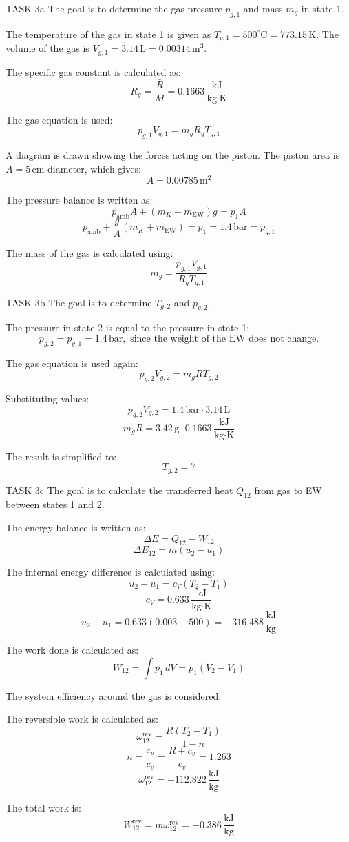 TASK 3a  
The goal is to determine the gas pressure \( p_{g,1} \) and mass \( m_g \) in state 1.  

The temperature of the gas in state 1 is given as \( T_{g,1} = 500^\circ\text{C} = 773.15 \, \text{K} \).  
The volume of the gas is \( V_{g,1} = 3.14 \, \text{L} = 0.00314 \, \text{m}^3 \).  

The specific gas constant is calculated as:  
\[
R_g = \frac{\bar{R}}{M} = 0.1663 \, \frac{\text{kJ}}{\text{kg·K}}
\]  

The gas equation is used:  
\[
p_{g,1} V_{g,1} = m_g R_g T_{g,1}
\]  

A diagram is drawn showing the forces acting on the piston. The piston area is \( A = 5 \, \text{cm diameter} \), which gives:  
\[
A = 0.00785 \, \text{m}^2
\]  

The pressure balance is written as:  
\[
p_{\text{amb}} A + (m_K + m_{\text{EW}}) g = p_{1} A
\]  
\[
p_{\text{amb}} + \frac{g}{A} (m_K + m_{\text{EW}}) = p_{1} = 1.4 \, \text{bar} = p_{g,1}
\]  

The mass of the gas is calculated using:  
\[
m_g = \frac{p_{g,1} V_{g,1}}{R_g T_{g,1}}
\]  

TASK 3b  
The goal is to determine \( T_{g,2} \) and \( p_{g,2} \).  

The pressure in state 2 is equal to the pressure in state 1:  
\[
p_{g,2} = p_{g,1} = 1.4 \, \text{bar}, \text{ since the weight of the EW does not change.}
\]  

The gas equation is used again:  
\[
p_{g,2} V_{g,2} = m_g R T_{g,2}
\]  

Substituting values:  
\[
p_{g,2} V_{g,2} = 1.4 \, \text{bar} \cdot 3.14 \, \text{L}
\]  
\[
m_g R = 3.42 \, \text{g} \cdot 0.1663 \, \frac{\text{kJ}}{\text{kg·K}}
\]  

The result is simplified to:  
\[
T_{g,2} = 7
\]  

TASK 3c  
The goal is to calculate the transferred heat \( Q_{12} \) from gas to EW between states 1 and 2.  

The energy balance is written as:  
\[
\Delta E = Q_{12} - W_{12}
\]  
\[
\Delta E_{12} = m (u_2 - u_1)
\]  

The internal energy difference is calculated using:  
\[
u_2 - u_1 = c_V (T_2 - T_1)
\]  
\[
c_V = 0.633 \, \frac{\text{kJ}}{\text{kg·K}}
\]  
\[
u_2 - u_1 = 0.633 (0.003 - 500) = -316.488 \, \frac{\text{kJ}}{\text{kg}}
\]  

The work done is calculated as:  
\[
W_{12} = \int p_{1} \, dV = p_{1} (V_2 - V_1)
\]  

The system efficiency around the gas is considered.  

The reversible work is calculated as:  
\[
\omega_{12}^{\text{rev}} = \frac{R (T_2 - T_1)}{1 - n}
\]  
\[
n = \frac{c_p}{c_v} = \frac{R + c_v}{c_v} = 1.263
\]  
\[
\omega_{12}^{\text{rev}} = -112.822 \, \frac{\text{kJ}}{\text{kg}}
\]  

The total work is:  
\[
W_{12}^{\text{rev}} = m \omega_{12}^{\text{rev}} = -0.386 \, \frac{\text{kJ}}{\text{kg}}
\]  
